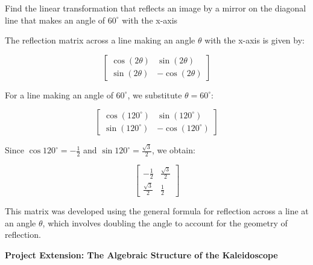     \begin{problem}
    Find the linear transformation that reflects an image by a mirror on the diagonal line that makes an angle of $60^\circ$ with the x-axis

     \vspace{0.3cm}

    The reflection matrix across a line making an angle $\theta$ with the x-axis is given by:

\[
\begin{bmatrix}
\cos(2\theta) & \sin(2\theta) \\
\sin(2\theta) & -\cos(2\theta)
\end{bmatrix}
\]

   \vspace{0.3cm}
   
For a line making an angle of $60^\circ$, we substitute $\theta = 60^\circ$:

\[
\begin{bmatrix}
\cos(120^\circ) & \sin(120^\circ) \\
\sin(120^\circ) & -\cos(120^\circ)
\end{bmatrix}
\]

   \vspace{0.3cm}

Since $\cos 120^\circ = -\frac{1}{2}$ and $\sin120^\circ = \frac{\sqrt{3}}{2}$, we obtain:

\[
\begin{bmatrix}
-\frac{1}{2} & \frac{\sqrt{3}}{2} \\
\frac{\sqrt{3}}{2} & \frac{1}{2}
\end{bmatrix}
\]

  \vspace{0.3cm}
  
This matrix was developed using the general formula for reflection across a line at an angle $\theta$, which involves doubling the angle to account for the geometry of reflection.
    \end{problem}

    \vspace{0.6cm}

\begin{center}
    \textbf{Project Extension: The Algebraic Structure of the Kaleidoscope\\}
\end{center}

